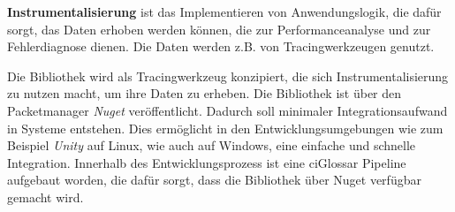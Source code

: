 	\textbf{Instrumentalisierung} ist das Implementieren von Anwendungslogik, die dafür sorgt, das Daten erhoben werden können, die zur Performanceanalyse und zur Fehlerdiagnose dienen. Die Daten werden z.B. von Tracingwerkzeugen genutzt.

Die Bibliothek wird als Tracingwerkzeug konzipiert, die sich Instrumentalisierung zu nutzen macht, um ihre Daten zu erheben.
Die Bibliothek ist über den Packetmanager \emph{Nuget} veröffentlicht. Dadurch soll minimaler Integrationsaufwand in Systeme entstehen. Dies ermöglicht in den Entwicklungsumgebungen wie zum Beispiel \emph{Unity} auf Linux, wie auch auf Windows, eine einfache und schnelle Integration. Innerhalb des Entwicklungsprozess ist eine \gls{ciGlossar} Pipeline aufgebaut worden, die dafür sorgt, dass die Bibliothek über Nuget verfügbar gemacht wird.

